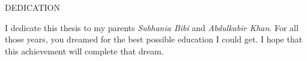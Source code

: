 \newpage
{}

\begin{center}
DEDICATION
\end{center}

\begin{center}
I dedicate this thesis to my parents \textit{Subhania Bibi} and \textit{Abdulkabir Khan}. For all those years, you dreamed for 
the best possible education I could get. I hope that this achievement will complete that dream.
\end{center}
